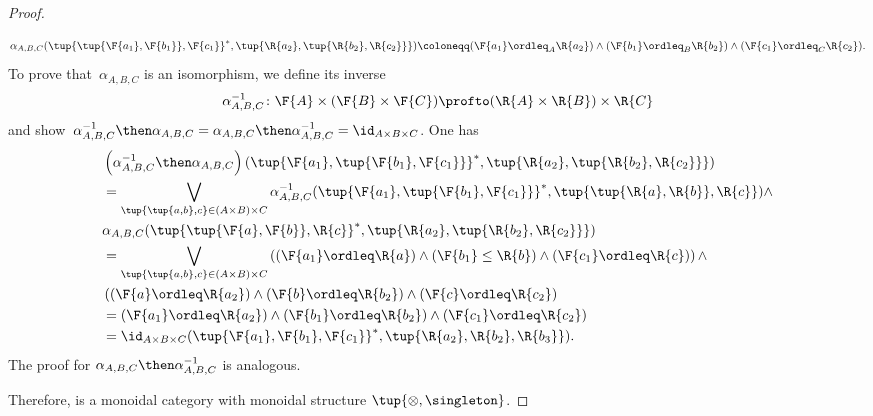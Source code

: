 \begin{proof}
\begin{itemize}
    \begin{equation}
        \alpha_{A,B,C}(\tup{\tup{\F{a_1},\F{b_1}},\F{c_1}}^*,\tup{\R{a_2},\tup{\R{b_2},\R{c_2}}})\coloneqq (\F{a_1}\ordleq_A \R{a_2}) \wedge (\F{b_1} \ordleq_B \R{b_2})\wedge (\F{c_1}\ordleq_C \R{c_2}).
    \end{equation}
    To prove that~$\alpha_{A,B,C}$ is an isomorphism, we define its inverse \begin{equation}
        \alpha_{A,B,C}^{-1}\colon \F{A}\times (\F{B}\times \F{C}) \profto (\R{A}\times \R{B})\times \R{C}
    \end{equation}
    and show~$\alpha_{A,B,C}^{-1}\then \alpha_{A,B,C}=\alpha_{A,B,C}\then \alpha_{A,B,C}^{-1}= \id_{A\times B\times C}$. One has
    \begin{equation}
        \begin{aligned}
           &\left( \alpha_{A,B,C}^{-1}\then \alpha_{A,B,C} \right)(\tup{\F{a_1},\tup{\F{b_1},\F{c_1}}}^*,\tup{\R{a_2},\tup{\R{b_2},\R{c_2}}})\\
           &=\bigvee_{\tup{\tup{a,b},c}\in (A\times B)\times C}
           \alpha_{A,B,C}^{-1}(\tup{\F{a_1},\tup{\F{b_1},\F{c_1}}}^*,\tup{\tup{\R{a},\R{b}},\R{c}})\wedge\\
           &\alpha_{A,B,C}(\tup{\tup{\F{a},\F{b}},\R{c}}^*,\tup{\R{a_2},\tup{\R{b_2},\R{c_2}}})\\
           &=\bigvee_{\tup{\tup{a,b},c}\in (A\times B)\times C}\left( (\F{a_1}\ordleq \R{a}) \wedge (\F{b_1}\leq \R{b}) \wedge (\F{c_1}\ordleq \R{c})\right)\wedge \\
           & \left((\F{a}\ordleq \R{a_2})\wedge (\F{b}\ordleq \R{b_2}) \wedge (\F{c}\ordleq \R{c_2}\right)\\
           &=(\F{a_1}\ordleq \R{a_2}) \wedge (\F{b_1}\ordleq \R{b_2}) \wedge (\F{c_1}\ordleq \R{c_2})\\
           &=\id_{A\times B\times C}(\tup{\F{a_1},\F{b_1},\F{c_1}}^*,\tup{\R{a_2},\R{b_2},\R{b_3}}).
        \end{aligned}
    \end{equation}
The proof for $\alpha_{A,B,C}\then \alpha_{A,B,C}^{-1}$ is analogous.
\end{itemize}
Therefore, \DP is a monoidal category with monoidal structure $\tup{\otimes, \singleton}$.
\end{proof}


